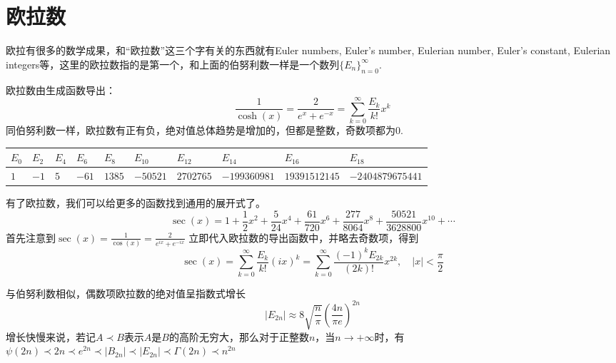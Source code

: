 \documentclass[main.tex]{subfiles}
\begin{document}
\section{欧拉数}

欧拉有很多的数学成果，和“欧拉数”这三个字有关的东西就有Euler numbers, Euler's number, Eulerian number, Euler's constant, Eulerian integers等，这里的欧拉数指的是第一个，和上面的伯努利数一样是一个数列\(\{E_n\}_{n=0}^{\infty}\).

欧拉数由生成函数导出：
\[ \frac{1}{\cosh(x)} = \frac{2}{e^{x}+e^{-x}} = \sum_{k=0}^{\infty}\frac{E_k}{k!}x^k\]
同伯努利数一样，欧拉数有正有负，绝对值总体趋势是增加的，但都是整数，奇数项都为0.\\
\begin{tabular}{|l|l|l|l|l|l|l|l|l|l|}
    \hline
    \(E_{0}\) & \(E_{2}\) & \(E_{4}\) & \(E_{6}\) & \(E_{8}\) & \(E_{10}\) & \(E_{12}\) & \(E_{14}\) & \(E_{16}\) & \(E_{18}\) \\
    \hline
    \(1\) & \(-1\) & \(5\) & \(-61\) & \(1385\) & \(-50521\) & \(2702765\) & \(-199360981\) & \(19391512145\) & \(−2404879675441\) \\
    \hline
\end{tabular}

有了欧拉数，我们可以给更多的函数找到通用的展开式了。
\[ \sec(x) = 1+\frac{1}{2}x^2+\frac{5}{24}x^4+\frac{61}{720}x^6+\frac{277}{8064}x^8+\frac{50521}{3628800}x^{10}+\cdots\]
首先注意到\(\displaystyle{\sec(x) = \frac{1}{\cos(x)} = \frac{2}{e^{ix}+e^{-ix}}}\)
立即代入欧拉数的导出函数中，并略去奇数项，得到
\[ \sec(x) = \sum_{k=0}^{\infty} \frac{E_k}{k!}(ix)^k = \sum_{k=0}^{\infty}\frac{(-1)^kE_{2k}}{(2k)!}x^{2k}, \quad |x|<\frac{\pi}{2}\]

与伯努利数相似，偶数项欧拉数的绝对值呈指数式增长
\[ |E_{2 n}| \approx 8 \sqrt { \frac{n}{\pi} } \left(\frac{4 n}{ \pi e}\right)^{2 n}\]
增长快慢来说，若记\(A \prec B\)表示\(A\)是\(B\)的高阶无穷大，那么对于正整数\(n\)，当\(n \to +\infty\)时，有\(\psi(2n) \prec 2n \prec e^{2n} \prec |B_{2n}| \prec |E_{2n}| \prec \Gamma(2n) \prec n^{2n}\)
\end{document}
